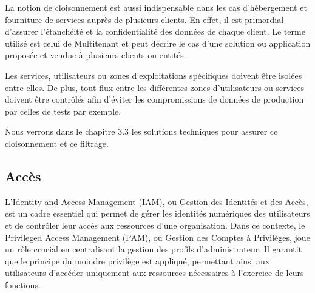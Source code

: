 La notion de cloisonnement est aussi indispensable dans les cas d'hébergement et fourniture de services auprès de plusieurs clients. En effet, il est primordial d'assurer l'étanchéité et la confidentialité des données de chaque client. Le terme utilisé est celui de Multitenant et peut décrire le cas d'une solution ou application proposée et vendue à plusieurs clients ou entités.

Les services, utilisateurs ou zones d'exploitations spécifiques doivent être isolées entre elles. De plus, tout flux entre les différentes zones d'utilisateurs ou services doivent être contrôlés afin d'éviter les compromissions de données de production par celles de tests par exemple.

Nous verrons dans le chapitre 3.3 les solutions techniques pour assurer ce cloisonnement et ce filtrage.



\subsection{Accès}


L'Identity and Access Management (IAM), ou Gestion des Identités et des Accès, est un cadre essentiel qui permet de gérer les identités numériques des utilisateurs et de contrôler leur accès aux ressources d'une organisation. 
Dans ce contexte, le Privileged Access Management (PAM), ou Gestion des Comptes à Privilèges, joue un rôle crucial en centralisant la gestion des profils d'administrateur. 
Il garantit que le principe du moindre privilège est appliqué, permettant ainsi aux utilisateurs d'accéder uniquement aux ressources nécessaires à l'exercice de leurs fonctions.


